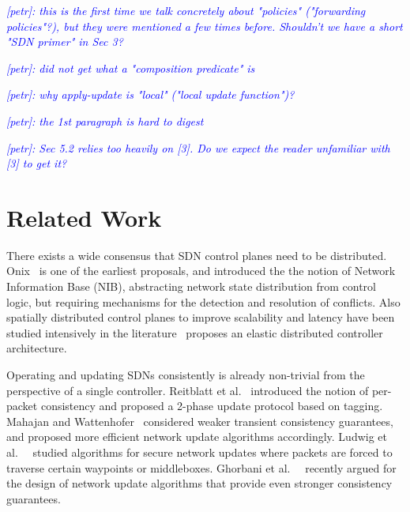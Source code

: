\documentclass[conference]{sigcomm-alternate}
\newcommand{\petr}[1]{\textit{\textcolor{blue}{[petr]: #1}}} %
\begin{document}
{

\petr{this is the first time we talk concretely about "policies" ("forwarding policies"?), but they were mentioned a few times before. Shouldn't we have a short "SDN primer" in Sec 3?}

\petr{did not get what a "composition predicate" is}

\petr{why apply-update is "local" ("local update function")?}

\petr{the 1st paragraph is hard to digest}

\petr{Sec 5.2 relies too heavily on [3]. Do we expect the reader unfamiliar with [3] to get it?}

\section{Related Work}\label{sec:relwork}

There exists a wide consensus that SDN control planes need to be distributed.~\cite{onos,onix,elasticon}
Onix~\cite{onix} is one of the earliest proposals, and introduced the
the notion of Network Information Base (NIB), abstracting network state
distribution from control logic, but
requiring mechanisms for the detection and resolution of conflicts.
Also spatially distributed control planes to improve scalability and
latency have been studied intensively
in the literature~\cite{kandoo,ctrl-place,hotsdn13loc}
proposes an elastic distributed controller architecture.

Operating and updating SDNs consistently is already non-trivial
from the perspective of a single controller. Reitblatt et al.~\cite{network-update}
introduced the notion of
per-packet consistency and proposed a 2-phase update protocol based on tagging.
Mahajan and Wattenhofer~\cite{roger-hotnets} considered weaker transient
consistency guarantees, and proposed more efficient network update algorithms
accordingly. Ludwig et al.~~\cite{hotnets14update} studied algorithms for secure
network updates where packets are forced to traverse certain waypoints or
middleboxes. Ghorbani et al.~~\cite{correct-virt} recently argued for the design
of network update algorithms that provide even stronger consistency guarantees.

}
\end{document}
